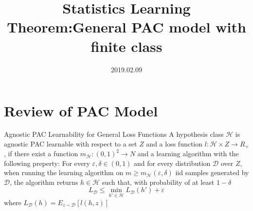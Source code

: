 \documentclass{beamer}
\title[Introduction]{Statistics Learning Theorem:General PAC model with finite class}
\author{}
\institute{}
\date{2019.02.09}
\begin{document}
\begin{frame}
  \titlepage
\end{frame}


\section{Review of PAC Model}
\begin{frame}{Agnostic PAC Learnability for General Loss Functions}
	A hypothesis class $\mathcal{H}$ is agnostic PAC learnable with respect to a set $Z$ and a loss function $l: \mathcal{H} \times Z \rightarrow R_+$, if there exist a function $m_{\mathcal{H}}:(0,1)^2 \rightarrow N$ and a learning algorithm with the following preperty: For every $\varepsilon,\delta \in (0,1)$ and for every distribution $\mathcal{D}$ over $Z$, when running the learning algorithm on $m \geq m_{\mathcal{H}} (\varepsilon,\delta)$ iid samples generated by $\mathcal{D}$, the algorithm returns $h \in \mathcal{H}$ such that, with probability of at least $1- \delta$
	\[L_{\mathcal{D}} \leq \min_{h' \in \mathcal{H}} L_{\mathcal{D}} (h') + \varepsilon\]
	where $L_{\mathcal{D}}(h) = E_{z \sim \mathcal{D}} [l(h,z)]$
\end{frame}
\end{document}
